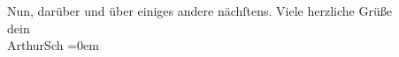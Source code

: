 \begin{ledgroupsized}[t]{13cm}
           \pstart
           Nun, darüber und \introOben{}über\introOben{} einiges andere nächſtens.\pend
           \pstart
           Viele herzliche Grüße{\\[\baselineskip]}dein{\\[\baselineskip]}\spacefill\mbox{ArthurSch}\pend
           \leftskip=0em{}\endnumbering{}\end{ledgroupsized}  \newcommand{\dateiname}{L01103}\newcommand{\titel}{Arthur Schnitzler an Hermann Bahr, [14. 3.? 1901]}\newcommand{\editorInnen}{ Kurt Ifkovits,  Martin Anton Müller}
      